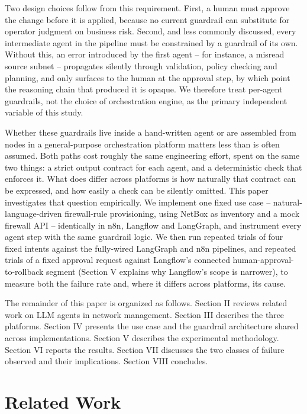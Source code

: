 \documentclass[conference]{IEEEtran}
\begin{document}
Two design choices follow from this requirement. First, a human must approve the change before it is applied, because no current guardrail can substitute for operator judgment on business risk. Second, and less commonly discussed, every intermediate agent in the pipeline must be constrained by a guardrail of its own. Without this, an error introduced by the first agent -- for instance, a misread source subnet -- propagates silently through validation, policy checking and planning, and only surfaces to the human at the approval step, by which point the reasoning chain that produced it is opaque. We therefore treat per-agent guardrails, not the choice of orchestration engine, as the primary independent variable of this study.

Whether these guardrails live inside a hand-written agent or are assembled from nodes in a general-purpose orchestration platform matters less than is often assumed. Both paths cost roughly the same engineering effort, spent on the same two things: a strict output contract for each agent, and a deterministic check that enforces it. What does differ across platforms is how naturally that contract can be expressed, and how easily a check can be silently omitted. This paper investigates that question empirically. We implement one fixed use case -- natural-language-driven firewall-rule provisioning, using NetBox as inventory and a mock firewall API -- identically in n8n, Langflow and LangGraph, and instrument every agent step with the same guardrail logic. We then run repeated trials of four fixed intents against the fully-wired LangGraph and n8n pipelines, and repeated trials of a fixed approval request against Langflow's connected human-approval-to-rollback segment (Section V explains why Langflow's scope is narrower), to measure both the failure rate and, where it differs across platforms, its cause.

The remainder of this paper is organized as follows. Section II reviews related work on LLM agents in network management. Section III describes the three platforms. Section IV presents the use case and the guardrail architecture shared across implementations. Section V describes the experimental methodology. Section VI reports the results. Section VII discusses the two classes of failure observed and their implications. Section VIII concludes.

\section{Related Work}
\end{document}
